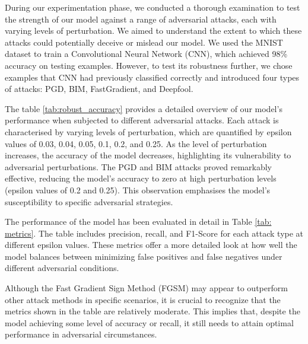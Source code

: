 \documentclass[10pt, conference, a4paper, final]{IEEEtran}
\begin{document}
During our experimentation phase, we conducted a thorough examination to test the strength of our model against a range of adversarial attacks, each with varying levels of perturbation. We aimed to understand the extent to which these attacks could potentially deceive or mislead our model. We used the MNIST dataset to train a Convolutional Neural Network (CNN), which achieved 98\% accuracy on testing examples. However, to test its robustness further, we chose examples that CNN had previously classified correctly and introduced four types of attacks: PGD, BIM, FastGradient, and Deepfool.

The table \ref{tab:robust_accuracy} provides a detailed overview of our model's performance when subjected to different adversarial attacks. Each attack is characterised by varying levels of perturbation, which are quantified by epsilon values of 0.03, 0.04, 0.05, 0.1, 0.2, and 0.25. As the level of perturbation increases, the accuracy of the model decreases, highlighting its vulnerability to adversarial perturbations. The PGD and BIM attacks proved remarkably effective, reducing the model's accuracy to zero at high perturbation levels (epsilon values of 0.2 and 0.25). This observation emphasises the model's susceptibility to specific adversarial strategies.

The performance of the model has been evaluated in detail in Table \ref{tab: metrics}. The table includes precision, recall, and F1-Score for each attack type at different epsilon values. These metrics offer a more detailed look at how well the model balances between minimizing false positives and false negatives under different adversarial conditions.

Although the Fast Gradient Sign Method (FGSM) may appear to outperform other attack methods in specific scenarios, it is crucial to recognize that the metrics shown in the table are relatively moderate. This implies that, despite the model achieving some level of accuracy or recall, it still needs to attain optimal performance in adversarial circumstances.
\end{document}
